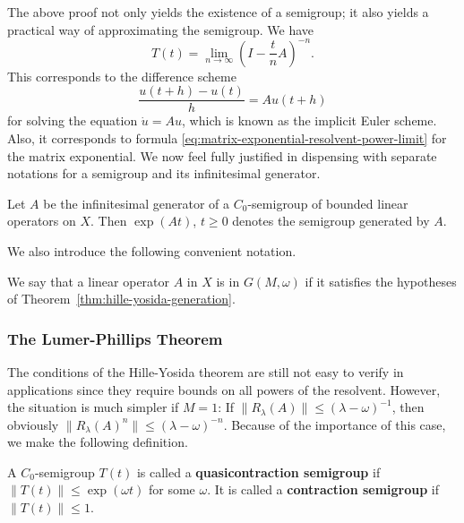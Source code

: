 The above proof not only yields the existence of a semigroup; it also yields a practical way of approximating the semigroup. We have
\begin{equation}\label{eq:semigroup-implicit-resolvent-approximation-formula}
T(t)=\lim_{n\to\infty}\left(I-\dfrac{t}{n}A\right)^{-n}.
\end{equation}
This corresponds to the difference scheme
\begin{equation}\label{eq:semigroup-implicit-euler-difference-scheme}
\dfrac{u(t+h)-u(t)}{h}=Au(t+h)
\end{equation}
for solving the equation $\dot u=Au$, which is known as the implicit Euler scheme. Also, it corresponds to formula \eqref{eq:matrix-exponential-resolvent-power-limit} for the matrix exponential. We now feel fully justified in dispensing with separate notations for a semigroup and its infinitesimal generator.

\begin{Definition}
\label{def:semigroup-exponential-notation}
Let $A$ be the infinitesimal generator of a $C_0$-semigroup of bounded linear operators on $X$. Then $\exp(At)$, $t\geq0$ denotes the semigroup generated by $A$.
\end{Definition}

We also introduce the following convenient notation.

\begin{Definition}
\label{def:semigroup-generator-class}
We say that a linear operator $A$ in $X$ is in $G(M,\omega)$ if it satisfies the hypotheses of Theorem~\ref{thm:hille-yosida-generation}.
\end{Definition}

\subsubsection{The Lumer-Phillips Theorem}\label{subsec:lumer-phillips-theorem}

The conditions of the Hille-Yosida theorem are still not easy to verify in applications since they require bounds on all powers of the resolvent. However, the situation is much simpler if $M=1$: If $\|R_\lambda(A)\|\leq(\lambda-\omega)^{-1}$, then obviously $\|R_\lambda(A)^n\|\leq(\lambda-\omega)^{-n}$. Because of the importance of this case, we make the following definition.

\begin{Definition}
\label{def:quasicontraction-contraction-semigroup}
A $C_0$-semigroup $T(t)$ is called a \textbf{quasicontraction semigroup} if $\|T(t)\|\leq\exp(\omega t)$ for some $\omega$. It is called a \textbf{contraction semigroup} if $\|T(t)\|\leq1$.
\end{Definition}

